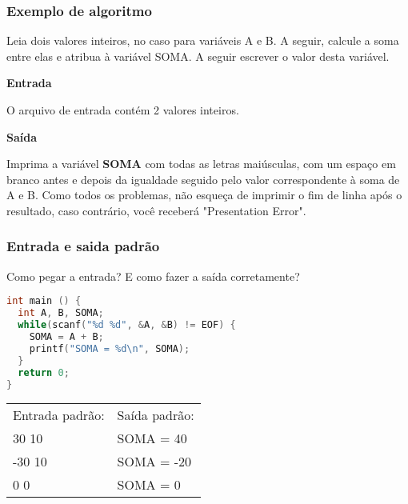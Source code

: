 \begin{frame}
	\label{tutorial}
  \frametitle{Exemplo de algoritmo}
    Leia dois valores inteiros, no caso para variáveis A e B. A seguir, calcule a soma entre elas e atribua à variável SOMA. A seguir escrever o valor desta variável.

  \begin{center}
    \textbf{Entrada}
  \end{center}
  O arquivo de entrada contém 2 valores inteiros.
  
  \begin{center}
    \textbf{Saída}
  \end{center}
  Imprima a variável \textbf{SOMA} com todas as letras maiúsculas, com um espaço em branco antes e depois da igualdade seguido pelo valor correspondente à soma de A e B. Como todos os problemas, não esqueça de imprimir o fim de linha após o resultado, caso contrário, você receberá "Presentation Error".
\end{frame}

\begin{frame}[fragile]
  \frametitle{Entrada e saida padrão}
  Como pegar a entrada? E como fazer a saída corretamente?
  \begin{lstlisting}[language=c]
int main () {
  int A, B, SOMA;
  while(scanf("%d %d", &A, &B) != EOF) {
    SOMA = A + B;
    printf("SOMA = %d\n", SOMA);
  }
  return 0;
}
  \end{lstlisting}
  \begin{tabular}{ll}\\
    Entrada padrão: &Saída padrão:\\
    30 10 &SOMA = 40\\
    -30 10 &SOMA = -20\\
    0 0 &SOMA = 0\\
  \end{tabular}
\end{frame}

